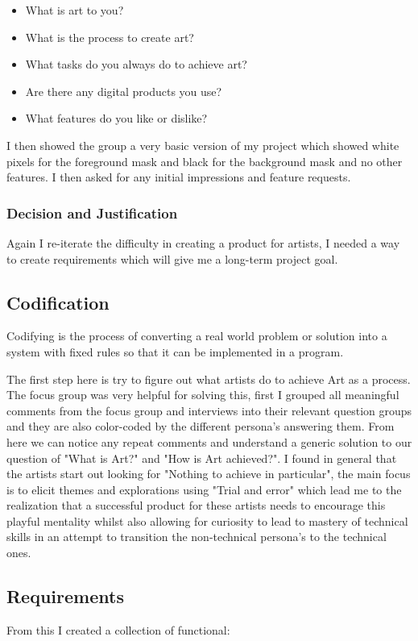 \documentclass[a4paper]{report}
\begin{document}
\begin{itemize}
\item What is art to you?
\item What is the process to create art?
\item What tasks do you always do to achieve art?
\item Are there any digital products you use?
\item What features do you like or dislike?
\end{itemize}

I then showed the group a very basic version of my project which showed white pixels for the foreground mask and black for the background mask and no other features. I then asked for any initial impressions and feature requests.

\subsubsection{Decision and Justification}
Again I re-iterate the difficulty in creating a product for artists, I needed a way to create requirements which will give me a long-term project goal.

\subsection{Codification}
Codifying is the process of converting a real world problem or solution into a system with fixed rules so that it can be implemented in a program. 

The first step here is try to figure out what artists do to achieve Art as a process. The focus group was very helpful for solving this, first I grouped all meaningful comments from the focus group and interviews into their relevant question groups and they are also color-coded by the different persona's answering them. From here we can notice any repeat comments and understand a generic solution to our question of "What is Art?" and "How is Art achieved?". I found in general that the artists start out looking for "Nothing to achieve in particular", the main focus is to elicit themes and explorations using "Trial and error" which lead me to the realization that a successful product for these artists needs to encourage this playful mentality whilst also allowing for curiosity to lead to mastery of technical skills in an attempt to transition the non-technical persona's to the technical ones. 

\subsection{Requirements}
From this I created a collection of functional:
\end{document}
